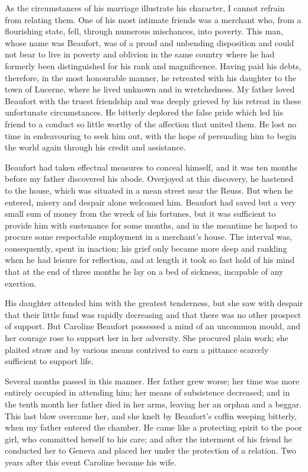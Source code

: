 \documentclass[12pt,openright]{book}
\begin{document}
As the circumstances of his marriage illustrate his character, I cannot refrain from relating them. One of his most intimate friends was a merchant who, from a flourishing state, fell, through numerous mischances, into poverty. This man, whose name was Beaufort, was of a proud and unbending disposition and could not bear to live in poverty and oblivion in the same country where he had formerly been distinguished for his rank and magnificence. Having paid his debts, therefore, in the most honourable manner, he retreated with his daughter to the town of Lucerne, where he lived unknown and in wretchedness. My father loved Beaufort with the truest friendship and was deeply grieved by his retreat in these unfortunate circumstances. He bitterly deplored the false pride which led his friend to a conduct so little worthy of the affection that united them. He lost no time in endeavouring to seek him out, with the hope of persuading him to begin the world again through his credit and assistance.

Beaufort had taken effectual measures to conceal himself, and it was ten months before my father discovered his abode. Overjoyed at this discovery, he hastened to the house, which was situated in a mean street near the Reuss. But when he entered, misery and despair alone welcomed him. Beaufort had saved but a very small sum of money from the wreck of his fortunes, but it was sufficient to provide him with sustenance for some months, and in the meantime he hoped to procure some respectable employment in a merchant’s house. The interval was, consequently, spent in inaction; his grief only became more deep and rankling when he had leisure for reflection, and at length it took so fast hold of his mind that at the end of three months he lay on a bed of sickness, incapable of any exertion.

His daughter attended him with the greatest tenderness, but she saw with despair that their little fund was rapidly decreasing and that there was no other prospect of support. But Caroline Beaufort possessed a mind of an uncommon mould, and her courage rose to support her in her adversity. She procured plain work; she plaited straw and by various means contrived to earn a pittance scarcely sufficient to support life.

Several months passed in this manner. Her father grew worse; her time was more entirely occupied in attending him; her means of subsistence decreased; and in the tenth month her father died in her arms, leaving her an orphan and a beggar. This last blow overcame her, and she knelt by Beaufort’s coffin weeping bitterly, when my father entered the chamber. He came like a protecting spirit to the poor girl, who committed herself to his care; and after the interment of his friend he conducted her to Geneva and placed her under the protection of a relation. Two years after this event Caroline became his wife.
\end{document}
